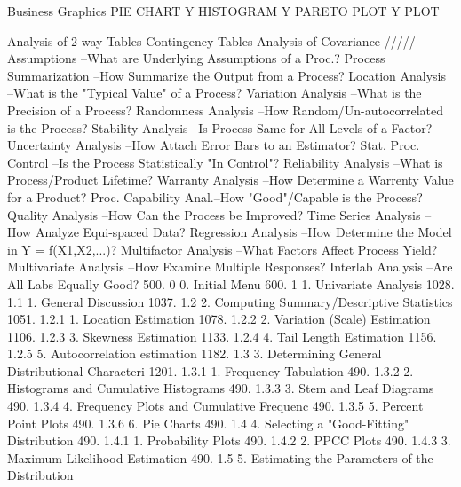 Business Graphics
   PIE CHART Y
   HISTOGRAM Y
   PARETO PLOT Y
   PLOT
 
Analysis of 2-way Tables
Contingency Tables
Analysis of Covariance
/////
Assumptions           --What are Underlying Assumptions of a Proc.?
Process Summarization --How Summarize the Output from a Process?
Location Analysis     --What is the "Typical Value" of a Process?
Variation Analysis    --What is the Precision of a Process?
Randomness Analysis   --How Random/Un-autocorrelated is the Process?
Stability Analysis    --Is Process Same for All Levels of a Factor?
Uncertainty Analysis  --How Attach Error Bars to an Estimator?
Stat. Proc. Control   --Is the Process Statistically "In Control"?
Reliability Analysis  --What is Process/Product Lifetime?
Warranty Analysis     --How Determine a Warrenty Value for a Product?
Proc. Capability Anal.--How "Good"/Capable is the Process?
Quality Analysis      --How Can the Process be Improved?
Time Series Analysis  --How Analyze Equi-spaced Data?
Regression Analysis   --How Determine the Model in Y = f(X1,X2,...)?
Multifactor Analysis  --What Factors Affect Process Yield?
Multivariate Analysis --How Examine Multiple Responses?
Interlab Analysis     --Are All Labs Equally Good?
500.      0           0. Initial Menu
600.      1               1. Univariate Analysis
1028.     1.1                   1. General Discussion
1037.     1.2                   2. Computing Summary/Descriptive Statistics
1051.     1.2.1                       1. Location Estimation
1078.     1.2.2                       2. Variation (Scale) Estimation
1106.     1.2.3                       3. Skewness Estimation
1133.     1.2.4                       4. Tail Length Estimation
1156.     1.2.5                       5. Autocorrelation estimation
1182.     1.3                   3. Determining General Distributional Characteri
1201.     1.3.1                       1. Frequency Tabulation
490.      1.3.2                       2. Histograms and Cumulative Histograms
490.      1.3.3                       3. Stem and Leaf Diagrams
490.      1.3.4                       4. Frequency Plots and Cumulative Frequenc
490.      1.3.5                       5. Percent Point Plots
490.      1.3.6                       6. Pie Charts
490.      1.4                   4. Selecting a "Good-Fitting" Distribution
490.      1.4.1                       1. Probability Plots
490.      1.4.2                       2. PPCC Plots
490.      1.4.3                       3. Maximum Likelihood Estimation
490.      1.5                   5. Estimating the Parameters of the Distribution
